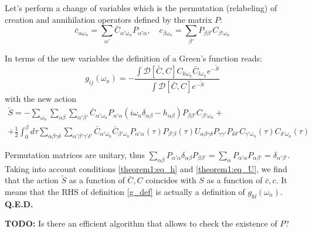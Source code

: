 \documentclass{article}
\newcommand{\bc}{\ensuremath{\bar c}}
\newcommand{\bC}{\ensuremath{\bar C}}
\begin{document}
Let's perform a change of variables which is the permutation (relabeling) of creation and annihilation
operators defined by the matrix $P$:
\begin{equation}
        \bc_{\alpha\omega_n} = \sum_{\alpha'}\bC_{\alpha'\omega_n}P_{\alpha'\alpha},\quad
        c_{\beta\omega_n} = \sum_{\beta'}P_{\beta\beta'}C_{\beta'\omega_n}
\end{equation}

In terms of the new variables the definition of a Green's function reads:
\begin{equation}\label{g_def}
    g_{ij}(\omega_n) = -\frac{\int\mathcal{D}[\bC,C]C_{k\omega_n}\bC_{l\omega_n}e^{-\tilde S}}
        {\int\mathcal{D}[\bC,C]e^{-\tilde S}}
\end{equation}
with the new action
\begin{multline}\label{action_new}
    \tilde S = -\sum_{\omega_n}\sum_{\alpha\beta}\sum_{\alpha'\beta'}
        \bC_{\alpha'\omega_n}P_{\alpha'\alpha}
            (i\omega_n\delta_{\alpha\beta}-h_{\alpha\beta})
        P_{\beta\beta'}C_{\beta'\omega_n} +\\+
        \frac{1}{2}\int_0^\beta d\tau
        \sum_{\alpha\beta\gamma\delta}
        \sum_{\alpha'\beta'\gamma'\delta'}
        \bC_{\alpha'\omega_n}\bC_{\beta'\omega_n}
        P_{\alpha'\alpha}(\tau)P_{\beta'\beta}(\tau)
        U_{\alpha\beta\gamma\delta}
        P_{\gamma\gamma'}P_{\delta\delta'}
        C_{\gamma'\omega_n}(\tau)C_{\delta'\omega_n}(\tau)
\end{multline}

Permutation matrices are unitary, thus $\sum_{\alpha\beta} P_{\alpha'\alpha}\delta_{\alpha\beta}
P_{\beta\beta'} = \sum_{\alpha} P_{\alpha'\alpha}P_{\alpha\beta'} = \delta_{\alpha'\beta'}$.
Taking into account conditions \ref{theorem1:eq_h} and \ref{theorem1:eq_U}, we find that the
action $\tilde S$ as a function of $\bC,C$ coincides with $S$ as a function of $\bc,c$. It means
that the RHS of definition \ref{g_def} is actually a definition of $g_{kl}(\omega_n)$. \textbf{Q.E.D.}

\vspace{5mm}
\textbf{TODO:} Is there an efficient algorithm that allows to check the existence of $P$?
\end{document}

